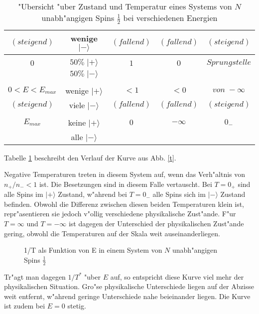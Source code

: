 \documentclass[12pt]{article}
\begin{document}
\begin{module}[id=mytemparature,uses=probability-intro]
\begin{table}
\begin{center}
\begin{tabular}{|c|c|c|c|c|}
     $(steigend) $&wenige $|-\rangle$&$(fallend)$&$(fallend)$&$(steigend)$\\ 
     \hline
                  &                  &           &           &\\
     $0$          &$50\%\;|+\rangle$ &$1$        &$0$        &$Sprungstelle$\\
                  &$50\%\;|-\rangle$ &           &           &\\
     \hline 
                  &                  &           &           &\\
     $0<E<E_{max}$&wenige $|+\rangle$&$<1$       &$<0$       &$von\;-\infty$\\
     $(steigend)$ &viele  $|-\rangle$&$(fallend)$&$(fallend)$&$(steigend)$\\
     \hline     
                  &                  &           &           &\\
     $E_{max}    $&keine  $|+\rangle$&$0$       &$-\infty$  &$0_-$      \\
                  &alle   $|-\rangle$&          &           &            \\ 
     \hline
         
\end{tabular}
\caption{"Ubersicht "uber Zustand und Temperatur eines Systems von $N$ 
unabh"angigen Spins $\frac{1}{2}$ bei verschiedenen Energien}
\label{uebersicht}
\end{center}
\end{table}
Tabelle \ref{uebersicht} beschreibt den Verlauf der Kurve aus Abb. \ref{t}. 

Negative Temperaturen treten in diesem System auf, wenn das Verh"altnis 
von $n_+/n_- < 1$ ist. Die Besetzungen sind in diesem Falle vertauscht. 
Bei $T=0_+$ sind alle Spins im $|+\rangle$ Zustand, w"ahrend bei $T=0_-$
alle Spins sich im $|-\rangle$ Zustand befinden. Obwohl die Differenz zwischen
diesen beiden Temperaturen
klein ist, repr"asentieren sie jedoch v"ollig verschiedene physikalische
Zust"ande. F"ur $T=\infty$ und $T=-\infty$ ist dagegen der Unterschied der
physikalischen Zust"ande gering, obwohl die Temperaturen auf der Skala weit
auseinanderliegen. 
 
\begin{figure} 
\centerline{}
\caption{1/T als Funktion von E in einem System von $N$ unabh"angigen Spins 
$\frac{1}{2}$
\label{1t}}
\end{figure}

Tr"agt man dagegen $1/T^*$ "uber $E$ auf, so entspricht diese Kurve viel mehr
der physikalischen Situation. Gro"se physikalische Unterschiede 
liegen auf der Abzisse weit entfernt, w"ahrend geringe Unterschiede nahe
beieinander liegen. Die Kurve ist zudem bei $E=0$ stetig.


\end{module}
\end{document}
